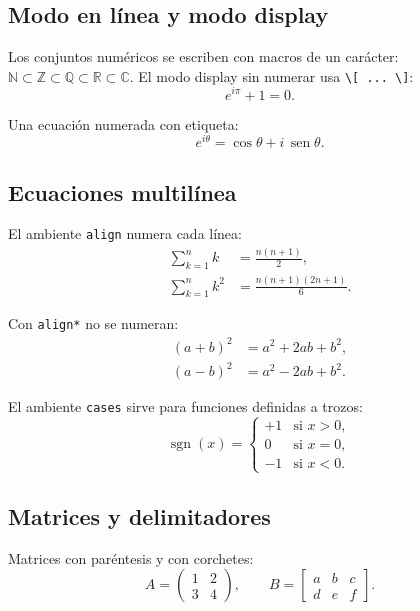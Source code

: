 \documentclass[letterpaper, 11pt]{article}
\newcommand{\N}{\ensuremath{\mathbb{N}}}
\newcommand{\Z}{\ensuremath{\mathbb{Z}}}
\newcommand{\Q}{\ensuremath{\mathbb{Q}}}
\newcommand{\R}{\ensuremath{\mathbb{R}}}
\newcommand{\C}{\ensuremath{\mathbb{C}}}
\DeclareMathOperator{\sen}{sen}
\begin{document}
\subsection{Modo en línea y modo display}

Los conjuntos numéricos se escriben con macros de un carácter:
$\N \subset \Z \subset \Q \subset \R \subset \C$. El modo display
sin numerar usa \verb|\[ ... \]|:
\[
    e^{i\pi} + 1 = 0.
\]

Una ecuación numerada con etiqueta:
\begin{equation}\label{eq:euler}
    e^{i\theta} = \cos\theta + i\,\sen\theta.
\end{equation}

\subsection{Ecuaciones multilínea}

El ambiente \texttt{align} numera cada línea:
\begin{align}
    \sum_{k=1}^{n} k &= \frac{n(n+1)}{2}, \label{eq:suma} \\
    \sum_{k=1}^{n} k^2 &= \frac{n(n+1)(2n+1)}{6}. \label{eq:suma2}
\end{align}

Con \texttt{align*} no se numeran:
\begin{align*}
    (a + b)^2 &= a^2 + 2ab + b^2, \\
    (a - b)^2 &= a^2 - 2ab + b^2.
\end{align*}

El ambiente \texttt{cases} sirve para funciones definidas a trozos:
\begin{equation}\label{eq:signo}
    \operatorname{sgn}(x) =
    \begin{cases}
        +1 & \text{si } x > 0, \\
         0 & \text{si } x = 0, \\
        -1 & \text{si } x < 0.
    \end{cases}
\end{equation}

\subsection{Matrices y delimitadores}

Matrices con paréntesis y con corchetes:
\[
    A = \begin{pmatrix}
        1 & 2 \\
        3 & 4
    \end{pmatrix}, \qquad
    B = \begin{bmatrix}
        a & b & c \\
        d & e & f
    \end{bmatrix}.
\]
\end{document}
